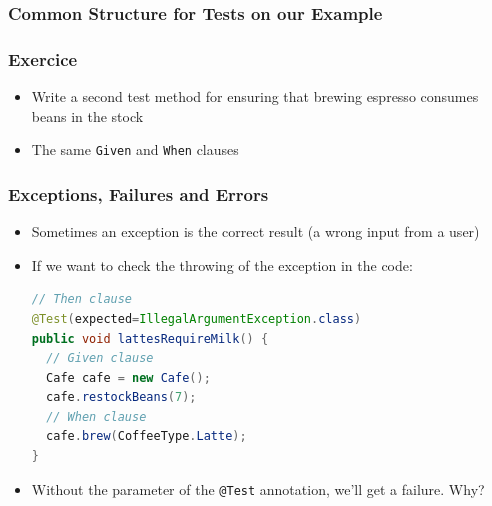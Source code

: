 \documentclass{beamer}
\begin{document}
\begin{frame}
  \frametitle{Common Structure for Tests on our Example}
\end{frame}

\begin{frame}
\frametitle{Exercice}
\begin{itemize}
\item Write a second test method for ensuring that brewing espresso
  consumes beans in the stock
\item The same \texttt{Given} and \texttt{When} clauses
\end{itemize}
\end{frame}

\begin{frame}[fragile]
  \frametitle{Exceptions, Failures and Errors}
\begin{itemize}
\item Sometimes an exception is the correct result (a wrong input from
  a user)
\item If we want to check the throwing of the exception in the code:
\begin{lstlisting}[language=JAVA]
// Then clause    
@Test(expected=IllegalArgumentException.class)
public void lattesRequireMilk() {
  // Given clause
  Cafe cafe = new Cafe();
  cafe.restockBeans(7);
  // When clause
  cafe.brew(CoffeeType.Latte);
}
\end{lstlisting}
\item[] Without the parameter of the \texttt{@Test} annotation, we'll
  get a failure. Why? 
\end{itemize}
\end{frame}
\end{document}
